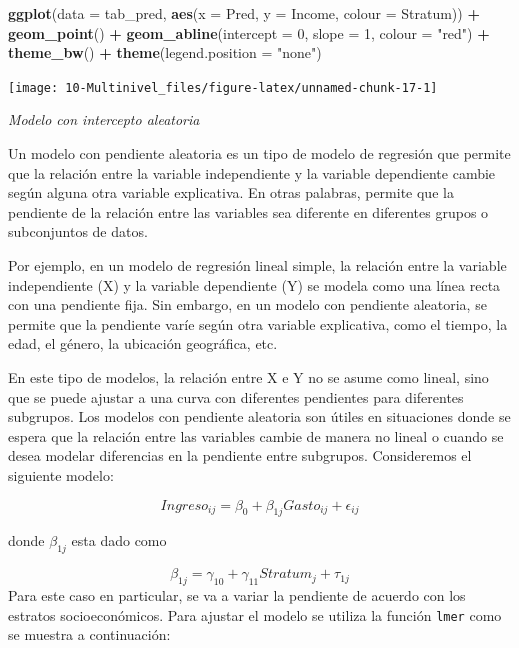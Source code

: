 \documentclass[
  spanish,
  12pt,
]{book}
\newenvironment{Shaded}{\begin{snugshade}}{\end{snugshade}}
\newcommand{\AttributeTok}[1]{\textcolor[rgb]{0.13,0.29,0.53}{#1}}
\newcommand{\DecValTok}[1]{\textcolor[rgb]{0.00,0.00,0.81}{#1}}
\newcommand{\FunctionTok}[1]{\textcolor[rgb]{0.13,0.29,0.53}{\textbf{#1}}}
\newcommand{\NormalTok}[1]{#1}
\newcommand{\SpecialCharTok}[1]{\textcolor[rgb]{0.81,0.36,0.00}{\textbf{#1}}}
\newcommand{\StringTok}[1]{\textcolor[rgb]{0.31,0.60,0.02}{#1}}
\begin{document}
\begin{Shaded}
\begin{Highlighting}[]
\FunctionTok{ggplot}\NormalTok{(}\AttributeTok{data =}\NormalTok{ tab\_pred, }\FunctionTok{aes}\NormalTok{(}\AttributeTok{x =}\NormalTok{ Pred, }\AttributeTok{y =}\NormalTok{ Income, }\AttributeTok{colour =}\NormalTok{ Stratum)) }\SpecialCharTok{+} 
  \FunctionTok{geom\_point}\NormalTok{() }\SpecialCharTok{+} \FunctionTok{geom\_abline}\NormalTok{(}\AttributeTok{intercept =} \DecValTok{0}\NormalTok{, }\AttributeTok{slope =} \DecValTok{1}\NormalTok{, }\AttributeTok{colour =} \StringTok{"red"}\NormalTok{) }\SpecialCharTok{+}
  \FunctionTok{theme\_bw}\NormalTok{() }\SpecialCharTok{+} \FunctionTok{theme}\NormalTok{(}\AttributeTok{legend.position =} \StringTok{"none"}\NormalTok{) }
\end{Highlighting}
\end{Shaded}

\texttt{[image: 10-Multinivel\_files/figure-latex/unnamed-chunk-17-1]}

\emph{Modelo con intercepto aleatoria}

Un modelo con pendiente aleatoria es un tipo de modelo de regresión que permite que la relación entre la variable independiente y la variable dependiente cambie según alguna otra variable explicativa. En otras palabras, permite que la pendiente de la relación entre las variables sea diferente en diferentes grupos o subconjuntos de datos.

Por ejemplo, en un modelo de regresión lineal simple, la relación entre la variable independiente (X) y la variable dependiente (Y) se modela como una línea recta con una pendiente fija. Sin embargo, en un modelo con pendiente aleatoria, se permite que la pendiente varíe según otra variable explicativa, como el tiempo, la edad, el género, la ubicación geográfica, etc.

En este tipo de modelos, la relación entre X e Y no se asume como lineal, sino que se puede ajustar a una curva con diferentes pendientes para diferentes subgrupos. Los modelos con pendiente aleatoria son útiles en situaciones donde se espera que la relación entre las variables cambie de manera no lineal o cuando se desea modelar diferencias en la pendiente entre subgrupos. Consideremos el siguiente modelo:

\[
Ingreso_{ij}=\beta_{0}+\beta_{1j}Gasto_{ij}+\epsilon_{ij}
\]

donde \(\beta_{1j}\) esta dado como

\[
\beta_{1j} = \gamma_{10}+\gamma_{11}Stratum_{j} + \tau_{1j}
\]
Para este caso en particular, se va a variar la pendiente de acuerdo con los estratos socioeconómicos. Para ajustar el modelo se utiliza la función \texttt{lmer} como se muestra a continuación:
\end{document}
